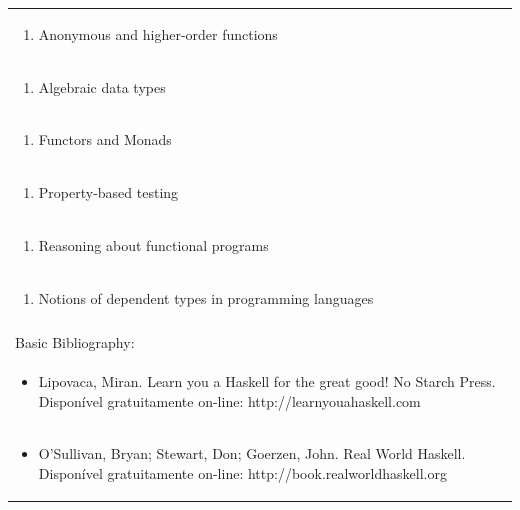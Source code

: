 \documentclass[11pt]{article}
\begin{document}
\begin{center}
\begin{longtable}{|p{4cm}|p{4cm}|p{4cm}|p{4cm}|}
\multicolumn{4}{|p{\dimexpr 16cm + 6\tabcolsep\relax}|}{\begin{enumerate}[start=8]\item Anonymous and higher-order functions\end{enumerate}}\\
\multicolumn{4}{|p{\dimexpr 16cm + 6\tabcolsep\relax}|}{\begin{enumerate}[start=9]\item Algebraic data types\end{enumerate}}\\
\multicolumn{4}{|p{\dimexpr 16cm + 6\tabcolsep\relax}|}{\begin{enumerate}[start=10]\item Functors and Monads\end{enumerate}}\\
\multicolumn{4}{|p{\dimexpr 16cm + 6\tabcolsep\relax}|}{\begin{enumerate}[start=11]\item Property-based testing\end{enumerate}}\\
\multicolumn{4}{|p{\dimexpr 16cm + 6\tabcolsep\relax}|}{\begin{enumerate}[start=12]\item Reasoning about functional programs\end{enumerate}}\\
\multicolumn{4}{|p{\dimexpr 16cm + 6\tabcolsep\relax}|}{\begin{enumerate}[start=13]\item Notions of dependent types in programming languages\end{enumerate}}\\
\multicolumn{4}{|p{\dimexpr 16cm + 6\tabcolsep\relax}|}{}\\
\hline
\multicolumn{4}{|p{16cm}|}{Basic Bibliography:}\\*
\multicolumn{4}{|p{\dimexpr 16cm + 6\tabcolsep\relax}|}{\begin{itemize}\item Lipovaca, Miran. Learn you a Haskell for the great good! No Starch Press. Disponível gratuitamente on-line: http://learnyouahaskell.com\end{itemize}}\\
\multicolumn{4}{|p{\dimexpr 16cm + 6\tabcolsep\relax}|}{\begin{itemize}\item O'Sullivan, Bryan; Stewart, Don; Goerzen, John. Real World Haskell. Disponível gratuitamente on-line: http://book.realworldhaskell.org\end{itemize}}\\

\end{longtable}
\end{center}
\end{document}
